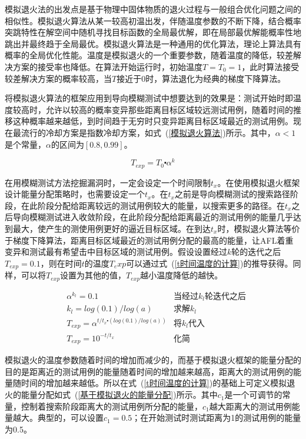 模拟退火法的出发点是基于物理中固体物质的退火过程与一般组合优化问题之间的相似性。模拟退火算法从某一较高初温出发，伴随温度参数的不断下降，结合概率突跳特性在解空间中随机寻找目标函数的全局最优解，即在局部最优解能概率性地跳出并最终趋于全局最优。模拟退火算法是一种通用的优化算法，理论上算法具有概率的全局优化性能。温度是模拟退火的一个重要参数，随着温度的降低，较差解决方案的接受率也降低。在算法开始运行时，初始温度$T=T_0=1$，此时算法接受较差解决方案的概率较高，当$T$接近于0时，算法退化为经典的梯度下降算法。

将模拟退火算法的框架应用到导向模糊测试中想要达到的效果是：测试开始时即温度较高时，允许以较高的概率变异那些距离目标区域较远测试用例，随着时间的推移这种概率越来越低，到时间趋于无穷时只变异距离目标区域最近的测试用例。现在最流行的冷却方案是指数冷却方案，如式~(\ref{模拟退火算法})所示。其中，$\alpha<1$是个常量，$\alpha$的区间为$[0.8,0.99]$。

\begin{equation}\label{模拟退火算法}
T_{exp} = T_0 \centerdot \alpha^{k}
\end{equation}

在用模糊测试方法挖掘漏洞时，一定会设定一个时间限制$t_x$。在使用模拟退火框架设计能量分配策略时，也需要设定一个$t_x$。在$t_x$之前是导向模糊测试的搜索路径阶段，在此阶段分配给距离较远的测试用例较大的能量，以搜索更多的路径。在$t_x$之后导向模糊测试进入收敛阶段，在此阶段分配给距离最近的测试用例的能量几乎达到最大，使产生的测使用例更好的逼近目标区域。在到达$t_x$时，模拟退火算法等价于梯度下降算法，距离目标区域最近的测试用例分配的最高的能量，让AFL着重变异和测试最有希望击中目标区域的测试用例。假设设置经过$k$轮的迭代之后$T_{exp}=0.1$，则在时间$t$的温度$T_exp$可以通过式~(\ref{t时间温度的计算})的推导获得。同样，可以将$T_{exp}$设置为其他的值，$T_{exp}$越小温度降低的越快。

\begin{equation}\label{t时间温度的计算}
\begin{aligned}
& \alpha^{k_{l}} = 0.1 & \text{当经过}k_{l}\text{轮迭代之后}\\
& k_{l} = log(0.1)/log(a) &\text{求解}k_{l}\\
& T_{exp} = \alpha^{t/t_{x} \centerdot (log(0.1)/log(a))} & \text{将}k_{l}\text{代入}\\
& T_{exp} = 10^{-t/t_{x}} &\text{化简}
\end{aligned}
\end{equation}

模拟退火的温度参数随着时间的增加而减少的，而基于模拟退火框架的能量分配的目的是距离近的测试用例的能量随着时间的增加越来越高，距离大的测试用例的能量随时间的增加越来越低。所以在式~(\ref{t时间温度的计算})的基础上可定义模拟退火的能量分配如式~(\ref{基于模拟退火的能量分配})所示。其中$c_{1}$是一个可调节的常量，控制着搜索阶段距离大的测试用例所分配的能量，$c_{1}$越大距离大的测试用例能量越大。典型的，可以设置$c_{1} = 0.5$；在开始测试时测试距离为1的测试用例的能量为0.5。

